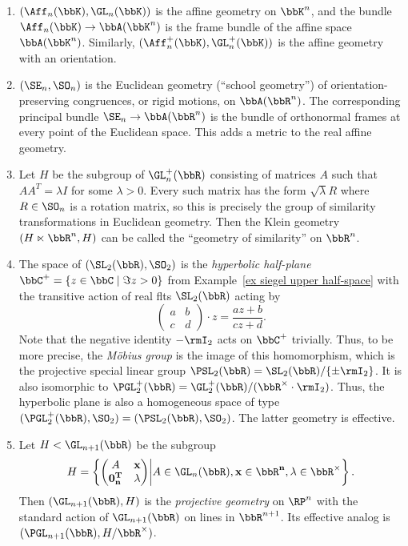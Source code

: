 \begin{example}
    \begin{enumerate}
        \item $(\Aff_n(\bbK), \GL_n(\bbK))$ is the affine geometry on $\bbK^n$, and the bundle $\Aff_n(\bbK)\to \bbA(\bbK^n)$ is the frame bundle of the affine space $\bbA(\bbK^n)$. Similarly, $(\Aff_n^+(\bbK), \GL_n^+(\bbK))$ is the affine geometry with an orientation.

        \item $(\SE_n,\SO_n)$ is the Euclidean geometry (``school geometry'') of orientation-preserving congruences, or rigid motions, on $\bbA(\bbR^n)$. The corresponding principal bundle $\SE_n\to \bbA(\bbR^n)$ is the bundle of orthonormal frames at every point of the Euclidean space. This adds a metric to the real affine geometry.

        \item Let $H$ be the subgroup of $\GL_n^+(\bbR)$ consisting of matrices $A$ such that $AA^T=\lambda I$ for some $\lambda>0$. Every such matrix has the form $\sqrt{\lambda}R$ where $R\in\SO_n$ is a rotation matrix, so this is precisely the group of similarity transformations in Euclidean geometry. Then the Klein geometry $(H\ltimes \bbR^n,H)$ can be called the ``geometry of similarity'' on $\bbR^n$.
        
        \item The space of $(\SL_2(\bbR),\SO_2)$ is the \emph{hyperbolic half-plane} $\bbC^+=\{z\in \bbC\mid \Im z>0\}$ from Example~\ref{ex siegel upper half-space} with the transitive action of real \glspl{flt} $\SL_2(\bbR)$ acting by 
        \[\begin{pmatrix}
            a&b\\c&d
        \end{pmatrix}\cdot z=\frac{az+b}{cz+d}.\]
        Note that the negative identity $-\rmI_2$ acts on $\bbC^+$ trivially. Thus, to be more precise, the \emph{M\"obius group} is the image of this homomorphism, which is the projective special linear group $\PSL_2(\bbR)=\SL_2(\bbR)\slash \{\pm \rmI_2\}$. It is also isomorphic to $\PGL^+_2(\bbR)=\GL^+_2(\bbR)\slash (\bbR^\times\cdot \rmI_2)$. Thus, the hyperbolic plane is also a homogeneous space of type $(\PGL^+_2(\bbR),\SO_2)=(\PSL_2(\bbR),\SO_2)$. The latter geometry is effective.

        \item Let $H<\GL_{n+1}(\bbR)$ be the subgroup
        \[H=\left\{\begin{pmatrix}
            A& \bf{x}\\ \bf{0}_n^T &\lambda
        \end{pmatrix}
        \middle| A\in\GL_n(\bbR),\bf{x}\in\bbR^n,\lambda\in \bbR^\times \right\}.\]
        Then $(\GL_{n+1}(\bbR),H)$ is the \emph{projective geometry} on $\RP^n$ with the standard action of $\GL_{n+1}(\bbR)$ on lines in $\bbR^{n+1}$. Its effective analog is $(\PGL_{n+1}(\bbR),H\slash \bbR^\times)$.
        

\end{enumerate}
\end{example}
